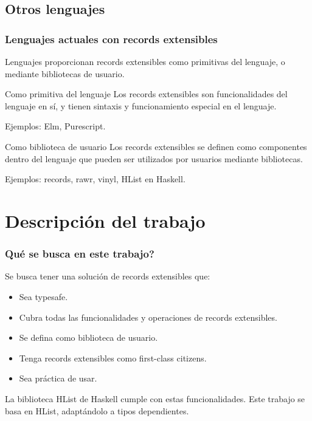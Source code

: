 \documentclass{beamer}
\begin{document}
\subsection{Otros lenguajes}

\begin{frame}
\frametitle{Lenguajes actuales con records extensibles}

Lenguajes proporcionan records extensibles como primitivas del lenguaje, o mediante bibliotecas de usuario.

\pause

\begin{block}{Como primitiva del lenguaje}
Los records extensibles son funcionalidades del lenguaje en sí, y tienen sintaxis y funcionamiento especial en el lenguaje.

Ejemplos: Elm, Purescript.
\end{block}

\pause

\begin{block}{Como biblioteca de usuario}
Los records extensibles se definen como componentes dentro del lenguaje que pueden ser utilizados por usuarios mediante bibliotecas.

Ejemplos: records, rawr, vinyl, HList en Haskell.
\end{block}


\end{frame}

\section{Descripción del trabajo}

\begin{frame}
\frametitle{Qué se busca en este trabajo?}

Se busca tener una solución de records extensibles que:

\begin{itemize}
\item Sea typesafe.
\item Cubra todas las funcionalidades y operaciones de records extensibles.
\item Se defina como biblioteca de usuario.
\item Tenga records extensibles como first-class citizens.
\item Sea práctica de usar.
\end{itemize}

\pause

La biblioteca HList de Haskell cumple con estas funcionalidades. Este trabajo se basa en HList, adaptándolo a tipos dependientes.

\end{frame}
\end{document}
